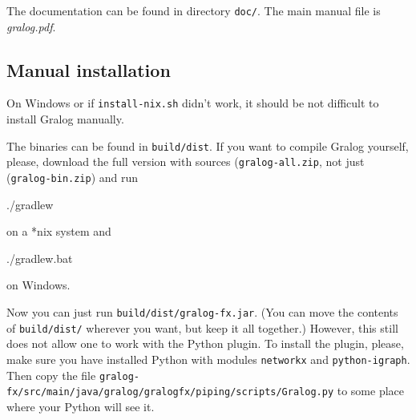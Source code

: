 \documentclass{article}
\begin{document}
The documentation can be found in directory \texttt{doc/}. The main
manual file is \emph{gralog.pdf}.

\subsection{Manual installation}

On Windows or if \texttt{install-nix.sh} didn't work, it should be not
difficult to install Gralog manually.

The binaries can be found in \texttt{build/dist}. If you want to
compile Gralog yourself, please, download the full version with sources
(\texttt{gralog-all.zip}, not just (\texttt{gralog-bin.zip}) and run

\begin{tcolorbox}
  ./gradlew
\end{tcolorbox}
on a *nix system and

\begin{tcolorbox}
  ./gradlew.bat
\end{tcolorbox}
on Windows.

Now you can just run \texttt{build/dist/gralog-fx.jar}. (You can move
the contents of \texttt{build/dist/} wherever you want, but keep it
all together.) However, this still
does not allow one to work with the Python plugin. To install the plugin,
please, make sure you have installed Python with modules
\texttt{networkx} and \texttt{python-igraph}. Then copy the file
\texttt{gralog-fx/src/main/java/gralog/gralogfx/piping/scripts/Gralog.py}
to some place where your Python will see it.






\end{document}
